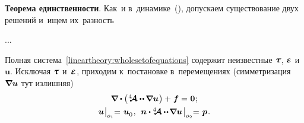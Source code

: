 \begin{otherlanguage}{russian}
\textbf{Теорема единственности}. Как~и в~динамике~(), допускаем существование двух решений и~ищем их~разность

...





\label{para:equationsfordisplacement}

Полная система~\eqref{lineartheory:wholesetofequations} содержит неизвестные $\mathboldtau$, $\mathboldepsilon$ и~$\bm{u}$. Исключая $\mathboldtau$ и~$\mathboldepsilon$, приходим к~постановке в~перемещениях (симметризация~${\bm{\nabla}\hspace{-0.2ex} \bm{u}}$ тут излишняя)
\vspace{-0.5em}\begin{equation}\label{lineartheory:equationsfordisplacement}
\begin{array}{c}
\boldnabla \dotp \left( \hspace{0.1ex} \stiffnesstensor \dotdotp \hspace{-0.12ex} \boldnabla \bm{u} \hspace{0.1ex} \right) + \hspace{0.1ex} \bm{f} = \hspace{0.1ex} \bm{0} \hspace{0.1ex}; \\[.4em]
\bm{u} \hspace{0.1ex} \bigr|_{o_1} \hspace{-0.64ex} = \hspace{0.2ex} \bm{u}_{\raisemath{-0.1em}{0}} \hspace{0.16ex} , \:\:
\bm{n} \dotp %
\stiffnesstensor \hspace{-0.08ex} \dotdotp \hspace{-0.24ex} \boldnabla \bm{u}
\hspace{0.25ex} \bigr|_{o_2} \hspace{-0.64ex} = \hspace{0.2ex} \bm{p} \hspace{0.16ex} .
\end{array}
\end{equation}%


\end{otherlanguage}
